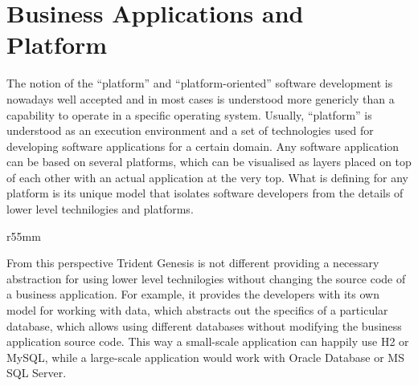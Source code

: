 \section{Business Applications and Platform}\label{sec:02}  

  The notion of the ``platform'' and ``platform-oriented'' software development is nowadays well accepted and in most cases is understood more genericly than a capability to operate in a specific operating system.
  Usually, ``platform'' is understood as an execution environment and a set of technologies used for developing software applications for a certain domain.
  Any software application can be based on several platforms, which can be visualised as layers placed on top of each other with an actual application at the very top.
  What is defining for any platform is its unique model that isolates software developers from the details of lower level technilogies and platforms.

  \begin{wrapfigure}{r}{55mm}
    \centering    
  \end{wrapfigure}
  
  From this perspective Trident Genesis is not different providing a necessary abstraction for using lower level technilogies without changing the source code of a business application.
  For example, it provides the developers with its own model for working with data, which abstracts out the specifics of a particular database, which allows using different databases without modifying the business application source code.
  This way a small-scale application can happily use H2 or MySQL, while a large-scale application would work with Oracle Database or MS SQL Server.


